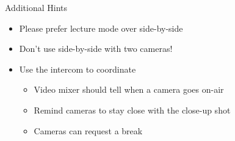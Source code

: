 
\begin{frame}{Additional Hints}
	\begin{itemize}
		\item Please prefer lecture mode over side-by-side
		\item Don't use side-by-side with two cameras!
		\item Use the intercom to coordinate
		\begin{itemize}
			\item Video mixer should tell when a camera goes on-air
			\item Remind cameras to stay close with the close-up shot
			\item Cameras can request a break
		\end{itemize}
	\end{itemize}
\end{frame}
